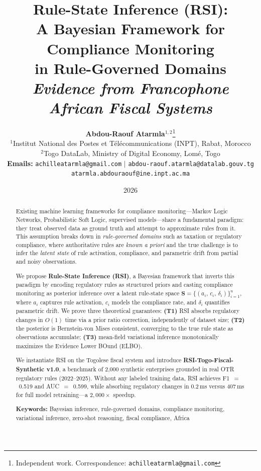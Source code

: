 \documentclass[letterpaper]{article}
\title{%
\textbf{Rule-State Inference (RSI):}\\
\textbf{A Bayesian Framework for Compliance Monitoring}\\
\textbf{in Rule-Governed Domains}\\[0.4em]
\large\textit{Evidence from Francophone African Fiscal Systems}
}
\author{
    \textbf{Abdou-Raouf Atarmla}$^{1,2}$\thanks{Independent work. Correspondence: \texttt{achilleatarmla@gmail.com}} \\
    \small $^{1}$Institut National des Postes et T\'el\'ecommunications (INPT), Rabat, Morocco \\
    \small $^{2}$Togo DataLab, Ministry of Digital Economy, Lom\'e, Togo \\
    \small \textbf{Emails:} \texttt{achilleatarmla@gmail.com} $|$ \texttt{abdou-raouf.atarmla@datalab.gouv.tg} \\
    \small \texttt{atarmla.abdouraouf@ine.inpt.ac.ma}
}
\date{2026}
\begin{document}
\maketitle
\thispagestyle{empty}

\begin{abstract}
\noindent
Existing machine learning frameworks for compliance monitoring---Markov
Logic Networks, Probabilistic Soft Logic, supervised models---share a
fundamental paradigm: they treat observed data as ground truth and
attempt to approximate rules from it. This assumption breaks down in
\emph{rule-governed domains} such as taxation or regulatory compliance,
where authoritative rules are \emph{known a priori} and the true
challenge is to infer the \emph{latent state} of rule activation,
compliance, and parametric drift from partial and noisy observations.

We propose \textbf{Rule-State Inference (RSI)}, a Bayesian framework
that inverts this paradigm by encoding regulatory rules as structured
priors and casting compliance monitoring as posterior inference over a
latent rule-state space $\mathbf{S} = \{(a_i,\, c_i,\, \delta_i)\}_{i=1}^n$,
where $a_i$ captures rule activation, $c_i$ models the compliance rate,
and $\delta_i$ quantifies parametric drift. We prove three theoretical
guarantees:
\textbf{(T1)} RSI absorbs regulatory changes in $O(1)$ time via a
prior ratio correction, independently of dataset size;
\textbf{(T2)} the posterior is Bernstein-von Mises consistent,
converging to the true rule state as observations accumulate;
\textbf{(T3)} mean-field variational inference monotonically maximizes
the Evidence Lower BOund (ELBO).

We instantiate RSI on the Togolese fiscal system and introduce
\textbf{RSI-Togo-Fiscal-Synthetic v1.0}, a benchmark of 2{,}000
synthetic enterprises grounded in real OTR regulatory rules
(2022--2025). Without any labeled training data, RSI achieves
F1~$=$~0.519 and AUC~$=$~0.599, while absorbing regulatory changes
in 0.2\,ms versus 407\,ms for full model retraining---a $2{,}000\times$
speedup.

\medskip
\noindent\textbf{Keywords:} Bayesian inference, rule-governed domains,
compliance monitoring, variational inference, zero-shot reasoning,
fiscal compliance, Africa
\end{abstract}

\newpage

\end{document}

